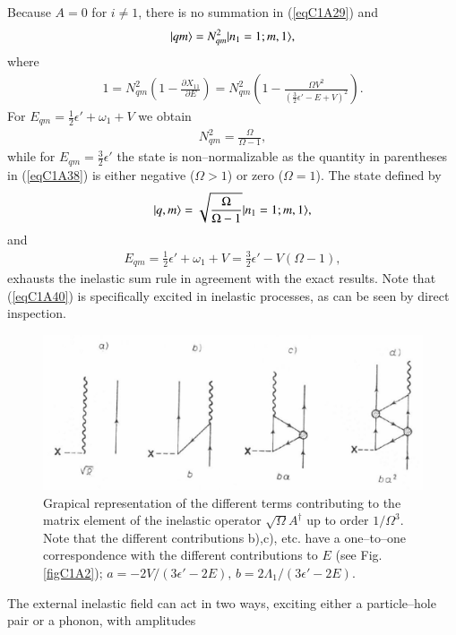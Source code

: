 Because $A=0$ for $i\neq 1$, there is no summation in (\ref{eqC1A29}) and
 \begin{align}\label{eqC1A37} 
|{qm} \rangle=N^2_{qm}|{n_1=1;m,1} \rangle,
 \end{align}
where
 \begin{align}\label{eqC1A38} 
1=N^2_{qm}\left(1-\frac{\partial X_{11}}{\partial E}\right)=N^2_{qm}\left(1-\frac{\Omega V^2}{\left(\frac{3}{2}\epsilon'-E+V\right)^2}\right).
 \end{align}
For $E_{qm}=\frac{1}{2}\epsilon'+\omega_1+V$ we obtain
 \begin{align}\label{eqC1A39} 
 N^2_{qm}=\frac{\Omega}{\Omega-1},
 \end{align}
while for $E_{qm}=\frac{3}{2}\epsilon'$ the state is non--normalizable as the quantity in parentheses
in (\ref{eqC1A38}) is either negative ($\Omega>1$) or zero ($\Omega=1$).
The state defined by
 \begin{align}\label{eqC1A40} 
|{q,m} \rangle=\sqrt{\frac{\Omega}{\Omega-1}}|{n_1=1;m,1} \rangle,
 \end{align}
and 
 \begin{align}\label{eqC1A41} 
E_{qm}=\frac{1}{2}\epsilon'+\omega_1+V=\frac{3}{2}\epsilon'-V(\Omega-1),
 \end{align}
exhausts the inelastic sum rule in agreement with the exact results. Note
that (\ref{eqC1A40}) is specifically excited in inelastic processes, as can be seen by
direct inspection.
  \begin{figure}
  \centerline {
  \includegraphics*[width=12cm]{introduccion/figs/fig20}
  }
  \caption{Grapical representation of the different terms contributing to the matrix element of the inelastic operator $\sqrt{\Omega}A^\dagger$ up to order $1/\Omega^3$. Note that the different contributions b),c), etc. have a one--to--one correspondence with the different contributions to $E$ (see Fig. \ref{figC1A2}); $a=-2V/(3\epsilon'-2E),\,b=2\Lambda_1/(3\epsilon'-2E)$.}
  \label{figC1A3}
  \end{figure}
The external inelastic field can act in two ways, exciting either a particle--hole pair or a phonon, with amplitudes 
